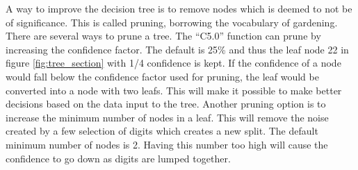 A way to improve the decision tree is to remove nodes which is deemed to not be of significance.
This is called pruning, borrowing the vocabulary of gardening.
There are several ways to prune a tree.
The ``C5.0'' function can prune by increasing the confidence factor. 
The default is 25\% and thus the leaf node 22 in figure \ref{fig:tree_section} with 1/4 confidence is kept.
If the confidence of a node would fall below the confidence factor used for pruning, the leaf would be converted into a node with two leafs.
This will make it possible to make better decisions based on the data input to the tree.
Another pruning option is to increase the minimum number of nodes in a leaf. 
This will remove the noise created by a few selection of digits which creates a new split.
The default minimum number of nodes is 2.
Having this number too high will cause the confidence to go down as digits are lumped together. 